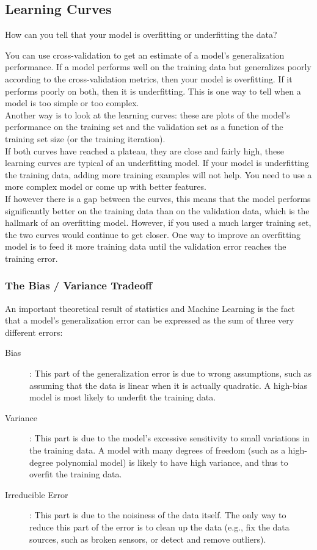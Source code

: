 \documentclass[french]{article}
\begin{document}
\subsection{Learning Curves}

How can you tell that your model is overfitting or underfitting the data?

You can use cross-validation to get an estimate of a model’s generalization performance. If a model performs well on the training data but generalizes poorly according to the cross-validation metrics, then your model is overfitting. If it performs poorly on both, then it is underfitting. This is one way to tell when a model is too simple or too complex.\\

Another way is to look at the learning curves: these are plots of the model’s performance on the training set and the validation set as a function of the training set size (or the training iteration).\\

If both curves have reached a plateau, they are close and fairly high, these learning curves are typical of an underfitting model. If your model is underfitting the training data, adding more training examples will not help. You need to use a more complex model or come up with better features.\\

If however there is a gap between the curves, this means that the model performs significantly better on the training data than on the validation data, which is the hallmark of an overfitting model. However, if you used a much larger training set, the two curves would continue to get closer. One way to improve an overfitting model is to feed it more training data until the validation error reaches the training error.

\subsubsection{The Bias / Variance Tradeoff}

An important theoretical result of statistics and Machine Learning is the fact that a model’s generalization error can be expressed as the sum of three very different errors:

\begin{description}
    \item [Bias]: This part of the generalization error is due to wrong assumptions, such as assuming that the data is linear when it is actually quadratic. A high-bias model is most likely to underfit the training data.
    \item [Variance]: This part is due to the model’s excessive sensitivity to small variations in the training data. A model with many degrees of freedom (such as a high-degree polynomial model) is likely to have high variance, and thus to overfit the training data.
    \item [Irreducible Error]: This part is due to the noisiness of the data itself. The only way to reduce this part of the error is to clean up the data (e.g., fix the data sources, such as broken sensors, or detect and remove outliers).
\end{description}
\end{document}
